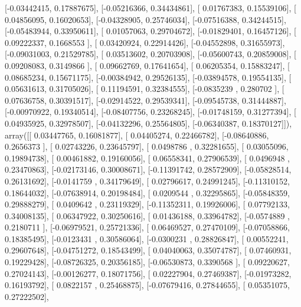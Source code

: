 \documentclass{article}
\begin{document}
       [-0.03442415,  0.17887675],
       [-0.05216366,  0.34434861],
       [ 0.01767383,  0.15539106],
       [ 0.04856095,  0.16020653],
       [-0.04328905,  0.25746034],
       [-0.07516388,  0.34244515],
       [-0.05483944,  0.33950611],
       [ 0.01057063,  0.29704672],
       [-0.01829401,  0.16457126],
       [ 0.09222337,  0.1668553 ],
       [ 0.03420924,  0.22914426],
       [-0.04552898,  0.31655973],
       [-0.09031003,  0.21529785],
       [ 0.03513602,  0.20703908],
       [-0.05600743,  0.20859008],
       [ 0.09208083,  0.3149866 ],
       [ 0.09662769,  0.17641654],
       [ 0.06205354,  0.15883247],
       [ 0.08685234,  0.15671175],
       [-0.00384942,  0.29526135],
       [-0.03894578,  0.19554135],
       [ 0.05631613,  0.31705026],
       [ 0.11194591,  0.32384555],
       [-0.0835239 ,  0.280702  ],
       [ 0.07636758,  0.30391517],
       [-0.02914522,  0.29539341],
       [-0.09545738,  0.31444887],
       [-0.00970922,  0.19340514],
       [-0.08407756,  0.23268245],
       [-0.01748159,  0.31277394],
       [ 0.04935925,  0.32978507],
       [-0.04132296,  0.25564805],
       [-0.06340387,  0.18370127]]), array([[ 0.03447765,  0.16081877],
       [ 0.04405274,  0.22466782],
       [-0.08640886,  0.2656373 ],
       [ 0.02743226,  0.23645797],
       [ 0.0498786 ,  0.32281655],
       [ 0.03055096,  0.19894738],
       [ 0.00461882,  0.19160056],
       [ 0.06558341,  0.27906539],
       [ 0.0496948 ,  0.23470863],
       [-0.02173146,  0.30008671],
       [-0.11391742,  0.28572909],
       [-0.05828514,  0.26131692],
       [-0.0141759 ,  0.34179649],
       [ 0.02796617,  0.24991245],
       [-0.11310152,  0.18644032],
       [-0.07638914,  0.20198484],
       [ 0.0209544 ,  0.32295865],
       [-0.05848359,  0.29888279],
       [ 0.0409642 ,  0.23119329],
       [-0.11352311,  0.19926006],
       [ 0.07792133,  0.34008135],
       [ 0.06347922,  0.30250616],
       [ 0.01436188,  0.33964782],
       [-0.0574889 ,  0.2180711 ],
       [-0.06979521,  0.25721336],
       [ 0.06469527,  0.27470109],
       [-0.07058866,  0.18385495],
       [-0.0123431 ,  0.30586064],
       [-0.0300231 ,  0.28826847],
       [ 0.00552241,  0.29607648],
       [-0.04751272,  0.18543499],
       [ 0.04040063,  0.35074787],
       [ 0.07460931,  0.19229428],
       [-0.08726325,  0.20356185],
       [-0.06530873,  0.3390568 ],
       [ 0.09220627,  0.27024143],
       [-0.00126277,  0.18071756],
       [ 0.02227904,  0.27469387],
       [-0.01973282,  0.16193792],
       [ 0.0822157 ,  0.25468875],
       [-0.07679416,  0.27844655],
       [ 0.05351075,  0.27222502],
\end{document}

